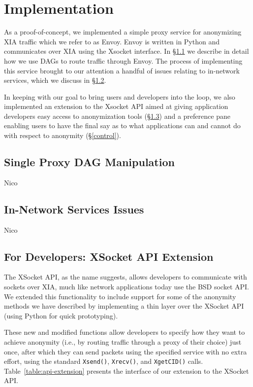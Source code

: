\documentclass{article}
\begin{document}
\section{Implementation}
\label{implementation}
As a proof-of-concept, we implemented a simple proxy service for anonymizing XIA traffic which we refer to as Envoy. Envoy is written in Python and communicates over XIA using the Xsocket interface. In \S\ref{proxy} we describe in detail how we use DAGs to route traffic through Envoy. The process of implementing this service brought to our attention a handful of issues relating to in-network services, which we discuss in \S\ref{in-network-services}.

In keeping with our goal to bring users and developers into the loop, we also implemented an extension to the Xsocket API aimed at giving application developers easy access to anonymization tools (\S\ref{api}) and a preference pane enabling users to have the final say as to what applications can and cannot do with respect to anonymity (\S\ref{control}).

\subsection{Single Proxy DAG Manipulation}
\label{proxy}
Nico

\subsection{In-Network Services Issues}
\label{in-network-services}
Nico

\subsection{For Developers: XSocket API Extension}
\label{api}
The XSocket API, as the name suggests, allows developers to communicate with sockets over XIA, much like network applications today use the BSD socket API. We extended this functionality to include support for some of the anonymity methods we have described by implementing a thin layer over the XSocket API (using Python for quick prototyping).

These new and modified functions allow developers to specify how they want to achieve anonymity (i.e., by routing traffic through a proxy of their choice) just once, after which they can send packets using the specified service with no extra effort, using the standard \texttt{Xsend()}, \texttt{Xrecv()}, and \texttt{XgetCID()} calls. Table~\ref{table:api-extension} presents the interface of our extension to the XSocket API.
\end{document}
